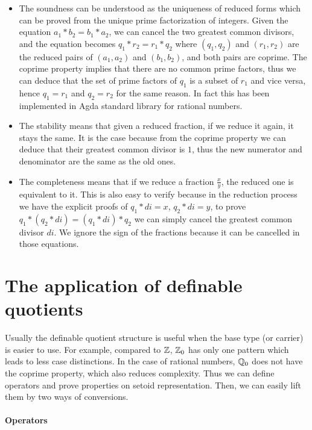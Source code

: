 \begin{itemize}
\item The soundness can be understood as the uniqueness of reduced forms which can be proved from the unique prime factorization of integers. Given the equation $a_1 * b_2 = b_1 * a_2$, we can cancel the two greatest common divisors, and the equation becomes $q_1 * r_2 = r_1 * q_2$ where $(q_1,q_2)$ and $(r_1,r_2)$ are the reduced pairs of $(a_1,a_2)$ and $(b_1,b_2)$, and both pairs are coprime. The coprime property implies that there are no common prime factors, thus we can deduce that the set of prime factors of $q_1$ is a subset of $r_1$ and vice versa, hence $q_1 = r_1$ and $q_2 = r_2$ for the same reason. In fact this has been implemented in Agda standard library for rational numbers.

\item The stability means that given a reduced fraction, if we reduce it again, it stays the same. It is the case because from the coprime property we can deduce that their greatest common divisor is $1$, thus the new numerator and denominator are the same as the old ones.

\item The completeness means that if we reduce a fraction $\frac{x}{y}$, the reduced one is equivalent to it. This is also easy to verify because in the reduction process we have the explicit proofs of $q_1*di=x$, $q_2*di=y$, to prove $q_1 * (q_2 * di) = (q_1 *di) * q_2$ we can simply cancel the greatest common divisor $di$. We ignore the sign of the fractions because it can be cancelled in those equations.
\end{itemize}


\section{The application of definable quotients}

Usually the definable quotient structure is useful when the base type (or carrier) is easier to use.  For example, compared to $\mathbb{Z}$, $\mathbb{Z}_0$ has only one pattern which leads to less case distinctions.
In  the case of rational numbers, $\mathbb{Q}_0$ does not have the coprime property, which also reduces complexity.
Thus we can define operators and prove properties on setoid representation. Then, we can easily lift them by two ways of conversions.

\paragraph{Operators}


